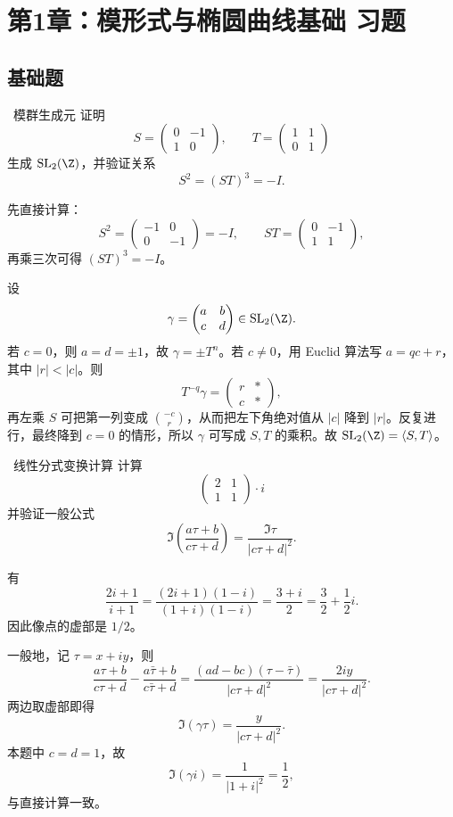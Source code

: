 \chapter{第1章：模形式与椭圆曲线基础 习题}
\label{ch:ex-ch1}

\difficultykey

\section{基础题 \easy}

\begin{problem}{\easy\ 模群生成元}
证明
\[
S=\begin{pmatrix}0&-1\\ 1&0\end{pmatrix},\qquad
T=\begin{pmatrix}1&1\\ 0&1\end{pmatrix}
\]
生成 $\mathrm{SL}_2(\Z)$，并验证关系
\[
S^2=(ST)^3=-I.
\]
\end{problem}
\begin{solution}
先直接计算：
\[
S^2=\begin{pmatrix}-1&0\\0&-1\end{pmatrix}=-I,
\qquad
ST=\begin{pmatrix}0&-1\\1&1\end{pmatrix},
\]
再乘三次可得 $(ST)^3=-I$。

设
\[
\gamma=\begin{pmatrix}a&b\\c&d\end{pmatrix}\in \mathrm{SL}_2(\Z).
\]
若 $c=0$，则 $a=d=\pm1$，故 $\gamma=\pm T^n$。若 $c\neq0$，用 Euclid 算法写 $a=qc+r$，其中 $|r|<|c|$。则
\[
T^{-q}\gamma=\begin{pmatrix}r&*\\ c&*\end{pmatrix},
\]
再左乘 $S$ 可把第一列变成 $\binom{-c}{r}$，从而把左下角绝对值从 $|c|$ 降到 $|r|$。反复进行，最终降到 $c=0$ 的情形，所以 $\gamma$ 可写成 $S,T$ 的乘积。故 $\mathrm{SL}_2(\Z)=\langle S,T\rangle$。
\end{solution}

\begin{problem}{\easy\ 线性分式变换计算}
计算
\[
\begin{pmatrix}2&1\\1&1\end{pmatrix}\cdot i
\]
并验证一般公式
\[
\Im\!\left(\frac{a\tau+b}{c\tau+d}\right)=\frac{\Im \tau}{|c\tau+d|^2}.
\]
\end{problem}
\begin{solution}
有
\[
\frac{2i+1}{i+1}=\frac{(2i+1)(1-i)}{(1+i)(1-i)}
=\frac{3+i}{2}
=\frac32+\frac12 i.
\]
因此像点的虚部是 $1/2$。

一般地，记 $\tau=x+iy$，则
\[
\frac{a\tau+b}{c\tau+d}-\frac{a\bar\tau+b}{c\bar\tau+d}
=\frac{(ad-bc)(\tau-\bar\tau)}{|c\tau+d|^2}
=\frac{2iy}{|c\tau+d|^2}.
\]
两边取虚部即得
\[
\Im(\gamma\tau)=\frac{y}{|c\tau+d|^2}.
\]
本题中 $c=d=1$，故
\[
\Im(\gamma i)=\frac{1}{|1+i|^2}=\frac12,
\]
与直接计算一致。
\end{solution}


